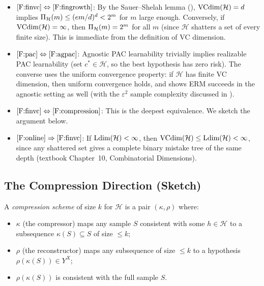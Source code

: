 \begin{itemize}[leftmargin=*,itemsep=4pt]
\item $\ref{F:finvc} \Leftrightarrow \ref{F:fingrowth}$:  By the Sauer--Shelah
  lemma (), $\mathrm{VCdim}(\mathcal{H}) = d$ implies
  $\Pi_\mathcal{H}(m) \leq (em/d)^d < 2^m$ for $m$ large enough.
  Conversely, if $\mathrm{VCdim}(\mathcal{H}) = \infty$, then $\Pi_\mathcal{H}(m) =
  2^m$ for all $m$ (since $\mathcal{H}$ shatters a set of every finite size).
  This is immediate from the definition of VC dimension.

\item $\ref{F:pac} \Leftrightarrow \ref{F:agpac}$:  Agnostic PAC learnability
  trivially implies realizable PAC learnability (set $c^* \in \mathcal{H}$, so
  the best hypothesis has zero risk).  The converse uses the uniform
  convergence property: if $\mathcal{H}$ has finite VC dimension, then uniform
  convergence holds, and  shows ERM succeeds in the agnostic
  setting as well (with the $\varepsilon^2$ sample complexity discussed in
  ).

\item $\ref{F:finvc} \Leftrightarrow \ref{F:compression}$:  This is the deepest
  equivalence.  We sketch the argument below.

\item $\ref{F:online} \Rightarrow \ref{F:finvc}$: If $\mathrm{Ldim}(\mathcal{H}) < \infty$,
  then $\mathrm{VCdim}(\mathcal{H}) \leq \mathrm{Ldim}(\mathcal{H}) < \infty$, since any shattered
  set gives a complete binary mistake tree of the same depth (textbook Chapter~10, Combinatorial Dimensions).
\end{itemize}


\subsection{The Compression Direction (Sketch)}
\label{sec:compression-direction}

\begin{defn}
\label{def:compression}
A \emph{compression scheme} of size $k$ for $\mathcal{H}$ is a pair
$(\kappa, \rho)$ where:
\begin{itemize}[nosep]
\item $\kappa$ (the compressor) maps any sample $S$ consistent with some
  $h \in \mathcal{H}$ to a subsequence $\kappa(S) \subseteq S$ of size
  $\leq k$;
\item $\rho$ (the reconstructor) maps any subsequence of size $\leq k$ to a
  hypothesis $\rho(\kappa(S)) \in Y^X$;
\item $\rho(\kappa(S))$ is consistent with the full sample $S$.
\end{itemize}
\end{defn}

